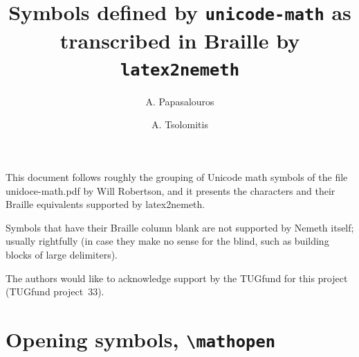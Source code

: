 \documentclass[oneside]{article}
\title{Symbols defined by \texttt{unicode-math} as transcribed in Braille by \texttt{latex2nemeth}}
\author{A. Papasalouros}
\author{A. Tsolomitis}
\affil{Department of Mathematics, University of the Aegean}
\begin{document}
\maketitle

This document follows roughly the grouping of Unicode math symbols of the file
unidoce-math.pdf by Will Robertson, and it presents the characters
and their Braille equivalents supported by latex2nemeth.

Symbols that have their Braille column blank are not supported by
Nemeth itself; usually rightfully (in case they make no sense for the
blind, such as building blocks of large delimiters).

\medskip

The authors would like to acknowledge support by the TUGfund for
this project (TUGfund project~33). 

\section{Opening symbols, \texttt{\textbackslash{}mathopen}}
\end{document}
